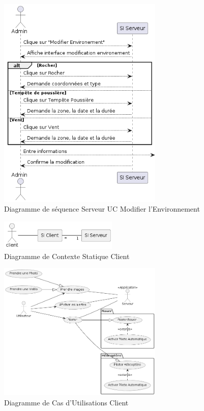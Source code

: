 \documentclass[12pt,a4paper]{scrartcl}
\begin{document}
\begin{figure}
    \centering
    \includegraphics[width=0.7\textwidth]{diag_seq_admin_modif.png}
    \caption{Diagramme de séquence Serveur UC Modifier l'Environnement }\label{seq2_serv}
\end{figure}


\begin{figure}
    \centering
    \includegraphics[width=0.5\textwidth]{Diag_CS_User.png}
    \caption{Diagramme de Contexte Statique Client }\label{cs_client}
\end{figure}

\begin{figure}
    \centering
    \includegraphics[width=0.7\textwidth]{diag_uc_client.png}
    \caption{Diagramme de Cas d'Utilisations Client }\label{uc_client}
\end{figure}
\end{document}
